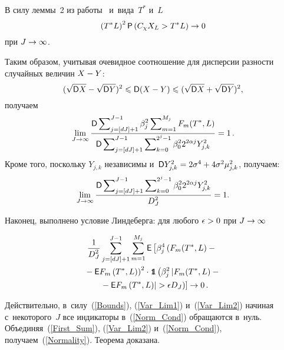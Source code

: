 \begin{multicols}{2}
\vspace*{-6pt}

\noindent
В силу леммы~2 из работы~\cite{Cai99} и~вида~$T^*$ и~$L$
$$
\left(T^*L\right)^2{\sf P}\left(C_\chi X_{L}\hm>T^*L\right)\to0
$$
при $J\hm\to\infty$.

Таким образом, учитывая очевидное соотношение для дисперсии разности случайных 
величин $X\hm-Y$: 
$$
(\sqrt{{\sf D} X}\hm-\sqrt{{\sf D} Y})^2\hm\leqslant {\sf D}(X\hm-
Y)\leqslant(\sqrt{{\sf D} X}+\sqrt{{\sf D} Y})^2,
$$
 получаем
\begin{equation}
\label{Var_Lim1}
\lim\limits_{J\to\infty}\displaystyle\frac{\displaystyle {\sf D}\sum\nolimits_{j=[dJ]+1}^{J-1}\beta^2_{j}\sum\nolimits_{m=1}^{M_j} 
F_m(T^*,L)\mathstrut}{\displaystyle {\sf D}\sum\nolimits_{j=[dJ]+1}^{J-1}\sum\nolimits_{k=0}^{2^j-
1}\beta^2_{0}2^{2\alpha j}Y^2_{j,k}\mathstrut}=1\,.
\end{equation}
Кроме того, поскольку $Y_{j,k}$ независимы и~${\sf D} Y^2_{j,k}\hm=2\sigma^4\hm+4\sigma^2\mu^2_{j,k}$, получаем:
\begin{equation}
\label{Var_Lim2}
\lim\limits_{J\to\infty}\displaystyle\frac{\displaystyle {\sf D}\sum\nolimits_{j=[dJ]+1}^{J-1}\sum\nolimits_{k=0}^{2^j-1}\beta^2_{0}2^{2\alpha j}Y^2_{j,k}\mathstrut}{\displaystyle D^2_J\mathstrut}=1.
\end{equation}

Наконец, выполнено условие Линдеберга: для любого $\epsilon\hm>0$ при $J\hm\to\infty$

\vspace*{-6pt}

\noindent
\begin{multline}
\label{Norm_Cond}
\displaystyle\frac{\displaystyle 1\mathstrut}{\displaystyle D^2_J\mathstrut}\sum\limits_{j=[dJ]+1}^{J-1}\sum\limits_{m=1}^{M_j} {\sf E}
\left[\beta^4_{j}\left( F_m(T^*,L)-{}\right.\right.\\
\left.{}-{\sf E} F_m\left(T^*,L\right)\right)^2\cdot \mbox{{{\tt 1}}\hspace{-1.3mm}{\sf 1}}\left( 
\beta^2_{j}\left\vert F_m(T^*,L)-{}\right.\right.\\
\left.\left.\left.{}-{\sf E} F_m\left(T^*,L\right)\right\vert >\epsilon D_J\right)\right]\rightarrow 0\,.
\end{multline}

\vspace*{-6pt}

\noindent
Действительно, в~силу~(\ref{Bounds}), (\ref{Var_Lim1}) и~(\ref{Var_Lim2}) 
начиная с~некоторого~$J$ все индикаторы в~(\ref{Norm_Cond}) обращаются в~нуль. Объединяя~(\ref{First_Sum}), 
(\ref{Var_Lim2}) и~(\ref{Norm_Cond}), получаем~(\ref{Normality}). Теорема 
доказана.


\pagebreak




\end{multicols}
